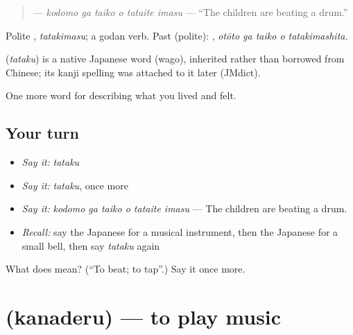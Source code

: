 \begin{quote}
\textbf{  } — \emph{kodomo ga taiko o tataite imasu} — \textquotedblleft{}The children are beating a drum.\textquotedblright{}
\end{quote}

Polite \textbf{}, \emph{tatakimasu}; a godan verb. Past (polite): \textbf{  }, \emph{otōto ga taiko o tatakimashita}.

\begin{cousinweb}
\textbf{} (\emph{tataku}) is a native Japanese word (wago), inherited rather than borrowed from Chinese; its kanji spelling was attached to it later (JMdict).
\end{cousinweb}

\begin{grammarlens}[title={What you've built}]
One more word for describing what you lived and felt.
\end{grammarlens}

\subsection*{Your turn}
\begin{itemize}
\raggedright
  \item \emph{Say it:} \emph{tataku}
  \item \emph{Say it:} \emph{tataku}, once more
  \item \emph{Say it:} \emph{kodomo ga taiko o tataite imasu} — The children are beating a drum.
  \item \emph{Recall:} say the Japanese for a musical instrument, then the Japanese for a small bell, then say \emph{tataku} again
\end{itemize}

\begin{tcolorbox}[breakable,colback=teal!4,colframe=teal!35!black,title={Before you move on}]
What does  mean? (\textquotedblleft{}To beat; to tap\textquotedblright{}.) Say it once more.
\end{tcolorbox}
\section[\texorpdfstring{\ja{かなでる} (kanaderu)}{かなでる (kanaderu)}]{ (kanaderu) — to play music}

\label{lesson:JA-C469-kanaderu}



